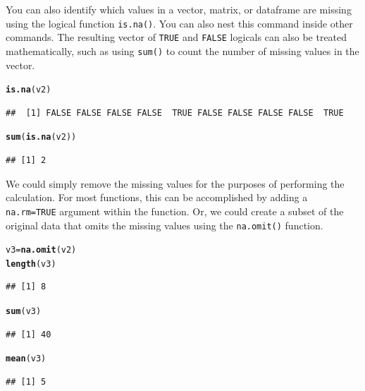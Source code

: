 \documentclass[12pt]{article}\usepackage[]{graphicx}\usepackage[]{color}
\makeatletter
\newcommand{\hlstd}[1]{\textcolor[rgb]{0.345,0.345,0.345}{#1}}%
\newcommand{\hlkwb}[1]{\textcolor[rgb]{0.69,0.353,0.396}{#1}}%
\newcommand{\hlkwd}[1]{\textcolor[rgb]{0.737,0.353,0.396}{\textbf{#1}}}%
\newenvironment{kframe}{%
 \def\at@end@of@kframe{}%
 \ifinner\ifhmode%
  \def\at@end@of@kframe{\end{minipage}}%
  \begin{minipage}{\columnwidth}%
 \fi\fi%
 \def\FrameCommand##1{\hskip\@totalleftmargin \hskip-\fboxsep
 \colorbox{shadecolor}{##1}\hskip-\fboxsep
     \hskip-\linewidth \hskip-\@totalleftmargin \hskip\columnwidth}%
 \MakeFramed {\advance\hsize-\width
   \@totalleftmargin\z@ \linewidth\hsize
   \@setminipage}}%
 {\par\unskip\endMakeFramed%
 \at@end@of@kframe}
\newenvironment{knitrout}{}{} %
\makeatother
\begin{document}
You can also identify which values in a vector, matrix, or dataframe are missing using the logical function \verb|is.na()|. You can also nest this command inside other commands. The resulting vector of \verb|TRUE| and \verb|FALSE| logicals can also be treated mathematically, such as using \verb|sum()| to count the number of missing values in the vector.
\begin{knitrout}
\color{fgcolor}\begin{kframe}
\begin{alltt}
\hlkwd{is.na}\hlstd{(v2)}
\end{alltt}
\begin{verbatim}
##  [1] FALSE FALSE FALSE FALSE  TRUE FALSE FALSE FALSE FALSE  TRUE
\end{verbatim}
\begin{alltt}
\hlkwd{sum}\hlstd{(}\hlkwd{is.na}\hlstd{(v2))}
\end{alltt}
\begin{verbatim}
## [1] 2
\end{verbatim}
\end{kframe}
\end{knitrout}


We could simply remove the missing values for the purposes of performing the calculation. For most functions, this can be accomplished by adding a \verb|na.rm=TRUE| argument within the function. Or, we could create a subset of the original data that omits the missing values using the \verb|na.omit()| function.
\begin{knitrout}
\color{fgcolor}\begin{kframe}
\begin{alltt}
\hlstd{v3} \hlkwb{=} \hlkwd{na.omit}\hlstd{(v2)}
\hlkwd{length}\hlstd{(v3)}
\end{alltt}
\begin{verbatim}
## [1] 8
\end{verbatim}
\begin{alltt}
\hlkwd{sum}\hlstd{(v3)}
\end{alltt}
\begin{verbatim}
## [1] 40
\end{verbatim}
\begin{alltt}
\hlkwd{mean}\hlstd{(v3)}
\end{alltt}
\begin{verbatim}
## [1] 5
\end{verbatim}
\end{kframe}
\end{knitrout}
\end{document}
